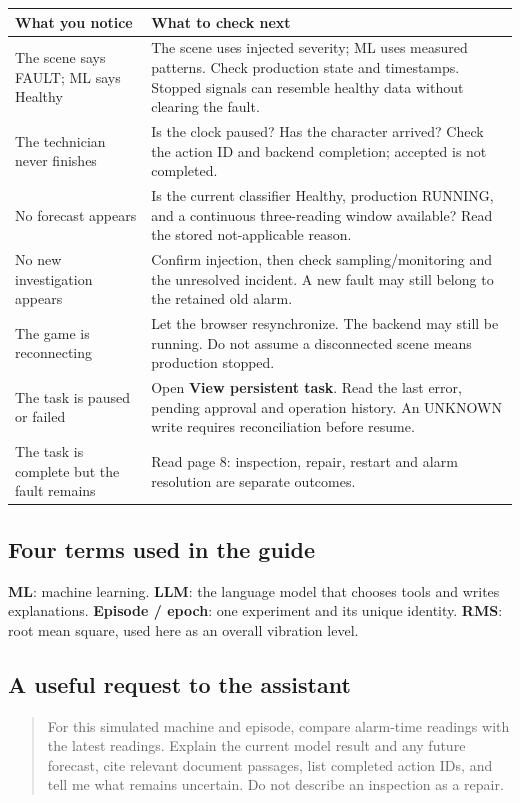 \begin{tabularx}{\linewidth}{@{}p{.34\linewidth}X@{}}\toprule
What you notice & What to check next\\\midrule
The scene says FAULT; ML says Healthy & The scene uses injected severity; ML uses measured patterns. Check production state and timestamps. Stopped signals can resemble healthy data without clearing the fault.\\
The technician never finishes & Is the clock paused? Has the character arrived? Check the action ID and backend completion; accepted is not completed.\\
No forecast appears & Is the current classifier Healthy, production RUNNING, and a continuous three-reading window available? Read the stored not-applicable reason.\\
No new investigation appears & Confirm injection, then check sampling/monitoring and the unresolved incident. A new fault may still belong to the retained old alarm.\\
The game is reconnecting & Let the browser resynchronize. The backend may still be running. Do not assume a disconnected scene means production stopped.\\
The task is paused or failed & Open \textbf{View persistent task}. Read the last error, pending approval and operation history. An UNKNOWN write requires reconciliation before resume.\\
The task is complete but the fault remains & Read page 8: inspection, repair, restart and alarm resolution are separate outcomes.\\\bottomrule
\end{tabularx}

\subsection*{Four terms used in the guide}
{\raggedright\small \textbf{ML}: machine learning. \textbf{LLM}: the language model that chooses tools and writes explanations. \textbf{Episode / epoch}: one experiment and its unique identity. \textbf{RMS}: root mean square, used here as an overall vibration level.\par}

\subsection*{A useful request to the assistant}
\begin{quote}\small
For this simulated machine and episode, compare alarm-time readings with the latest readings. Explain the current model result and any future forecast, cite relevant document passages, list completed action IDs, and tell me what remains uncertain. Do not describe an inspection as a repair.
\end{quote}

